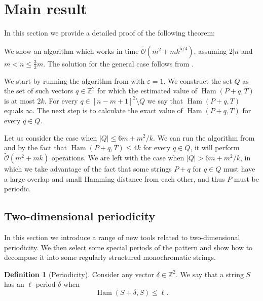 \documentclass[11pt]{article}
\newcommand{\Z}{\mathbb{Z}}
\newcommand{\tO}{\tilde{\mathcal{O}}}
\theoremstyle{plain}
\theoremstyle{definition}
\newtheorem{definition}{Definition}
\theoremstyle{remark}
\DeclareMathOperator*{\Ham}{Ham}
\begin{document}
\section{Main result}

In this section we provide a detailed proof of the following theorem:

\MainResult

We show an algorithm which works in time $\tO(m^2 + mk^{5/4})$, assuming $2|n$ and $m < n \le \frac{3}{2}m$.
The solution for the general case follows from . 

We start by running the algorithm from  with $\varepsilon = 1$.
We construct the set $Q$ as the set of such vectors $q \in \Z^2$ for which the estimated value of $\Ham(P + q, T)$ is at most $2k$.
For every $q \in [n - m + 1]^2 \setminus Q$ we say that $\Ham(P + q, T)$ equals $\infty$.
The next step is to calculate the exact value of $\Ham(P + q, T)$ for every $q \in Q$.

Let us consider the case when $|Q| \le 6m + m^2/k$.
We can run the algorithm from  and by the fact that $\Ham(P + q, T) \le 4k$ for every $q \in Q$, it will perform $\tO(m^2 + mk)$ operations.
We are left with the case when $|Q| > 6m + m^2/k$, in which we take advantage of the fact that some strings $P + q$ for $q \in Q$ must have a large overlap and small Hamming distance from each other, and thus $P$ must be periodic.


\newcommand{\T}{\mathcal{T}}
\renewcommand{\S}{\mathcal{S}}
\renewcommand{\P}{\mathcal{P}}
\newcommand{\U}{\mathcal{U}}
\newcommand{\V}{\mathcal{V}}
\newcommand{\F}{\mathcal{F}}
\renewcommand{\L}{\mathcal{L}}


\subsection{Two-dimensional periodicity} \label{periodicity_section}
In this section we introduce a range of new tools related to two-dimensional periodicity.
We then select some special periods of the pattern and show how to decompose it into some regularly structured monochromatic strings.


\begin{definition}[Periodicity]
	Consider any vector $\delta \in \Z^2$.
	We say that a string $S$ has an $\ell$-period $\delta$ when
	\[ \Ham(S + \delta, S) \le \ell. \]
\end{definition}
\end{document}
